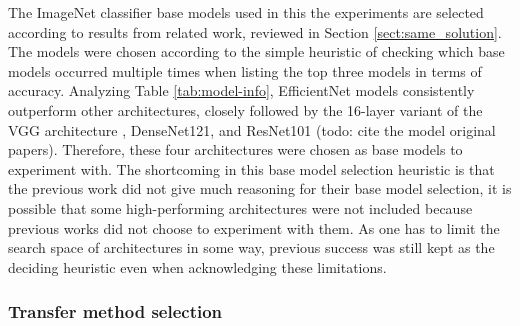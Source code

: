 \documentclass{article}
\begin{document}
The ImageNet classifier base models used in this the experiments are selected 
according to results from related work, reviewed in Section \ref{sect:same_solution}.
The models were chosen according to the simple heuristic of checking which base models 
occurred multiple times when listing the top three models in terms of accuracy. 
Analyzing Table \ref{tab:model-info}, EfficientNet models consistently outperform 
other architectures, closely followed by the 16-layer variant of the VGG architecture \cite{vgg},
DenseNet121, and ResNet101 (todo: cite the model original papers). Therefore, these four architectures were chosen as base models 
to experiment with. The shortcoming in this base model selection heuristic is that 
the previous work did not give much reasoning for their base model selection, it is possible that some high-performing architectures were not included 
because previous works did not choose to experiment with them. As one has to limit the 
search space of architectures in some way, previous success was still kept as the deciding heuristic 
even when acknowledging these limitations.


\subsubsection{Transfer method selection}


\end{document}
